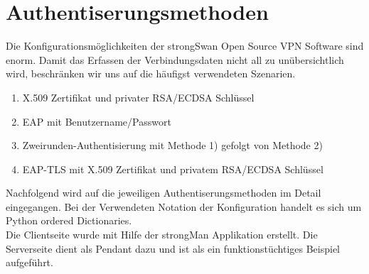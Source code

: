 \section{Authentiserungsmethoden}
Die Konfigurationsmöglichkeiten der strongSwan Open Source VPN Software sind enorm. Damit das Erfassen der Verbindungsdaten nicht all zu unübersichtlich wird, beschränken wir uns auf die häufigst verwendeten Szenarien.

\begin{enumerate}
	\item X.509 Zertifikat und privater RSA/ECDSA Schlüssel
	\item EAP mit Benutzername/Passwort
	\item Zweirunden-Authentisierung mit Methode 1) gefolgt von Methode 2)
	\item EAP-TLS mit X.509 Zertifikat und privatem RSA/ECDSA Schlüssel
\end{enumerate}

Nachfolgend wird auf die jeweiligen Authentiserungsmethoden im Detail eingegangen. Bei der Verwendeten Notation der Konfiguration handelt es sich um Python ordered Dictionaries.\\
Die Clientseite wurde mit Hilfe der strongMan Applikation erstellt. Die Serverseite dient als Pendant dazu und ist als ein funktionstüchtiges Beispiel aufgeführt.

